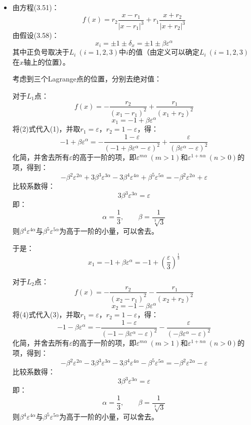 \documentclass[a4paper,fontset=windows]{ctexart}
\begin{document}
\begin{itemize}
        \item[3.]
        由方程(3.51)：
        \[
        f(x) = r_2\frac{x-r_1}{|x-r_1|^3} + r_1\frac{x+r_2}{|x+r_2|^3}
        \]
        由假设(3.58)：
        \[
        x_i = \pm 1 \pm \delta_x = \pm 1 \pm \beta\varepsilon^\alpha
        \]
        其中正负号取决于$L_i\ (i=1,2,3)$中$i$的值（由定义可以确定$L_i\ (i=1,2,3)$在$x$轴上的位置）。

        考虑到三个Lagrange点的位置，分别去绝对值：

        对于$L_1$点：
        \[
        f(x) = -\frac{r_2}{(x_1-r_1)^2} + \frac{r_1}{(x_1+r_2)^2} \tag{1}
        \]
        \[
        x_1 = -1 + \beta\varepsilon^\alpha \tag{2}
        \]
        将(2)式代入(1)，并取$r_1=\varepsilon$，$r_2=1-\varepsilon$，得：
        \[
        -1 + \beta\varepsilon^\alpha = -\frac{1-\varepsilon}{(-1+\beta\varepsilon^\alpha-\varepsilon)^2} + \frac{\varepsilon}{\left(\beta\varepsilon^\alpha-\varepsilon\right)^2}
        \]
        化简，并舍去所有$\varepsilon$的高于一阶的项，即$\varepsilon^{m\alpha}\ (m>1)$和$\varepsilon^{1+n\alpha}\ (n>0)$的项，得到：
        \[
        -\beta^2\varepsilon^{2\alpha} + 3\beta^3\varepsilon^{3\alpha} - 3\beta^4\varepsilon^{4\alpha} + \beta^5\varepsilon^{5\alpha} = -\beta^2\varepsilon^{2\alpha} + \varepsilon
        \]
        比较系数得：
        \[
        3\beta^3\varepsilon^{3\alpha} = \varepsilon
        \]
        即：
        \[
        \alpha = \frac{1}{3},\qquad \beta = \frac{1}{\sqrt[3]{3}}
        \]
        则$\beta^4\varepsilon^{4\alpha}$与$\beta^5\varepsilon^{5\alpha}$为高于一阶的小量，可以舍去。

        于是：
        \[
        x_1 = -1 + \beta\varepsilon^\alpha = -1 + \left(\frac{\varepsilon}{3}\right)^{\tfrac{1}{3}}
        \]
        \medskip

        对于$L_2$点：
        \[
        f(x) = -\frac{r_2}{(x_2-r_1)^2} - \frac{r_1}{(x_2+r_2)^2} \tag{3}
        \]
        \[
        x_2 = -1 - \beta\varepsilon^\alpha \tag{4}
        \]
        将(4)式代入(3)，并取$r_1=\varepsilon$，$r_2=1-\varepsilon$，得：
        \[
        -1 - \beta\varepsilon^\alpha = -\frac{1-\varepsilon}{(-1-\beta\varepsilon^\alpha-\varepsilon)^2} - \frac{\varepsilon}{\left(-\beta\varepsilon^\alpha-\varepsilon\right)^2}
        \]
        化简，并舍去所有$\varepsilon$的高于一阶的项，即$\varepsilon^{m\alpha}\ (m>1)$和$\varepsilon^{1+n\alpha}\ (n>0)$的项，得到：
        \[
        -\beta^2\varepsilon^{2\alpha} - 3\beta^3\varepsilon^{3\alpha} - 3\beta^4\varepsilon^{4\alpha} - \beta^5\varepsilon^{5\alpha} = -\beta^2\varepsilon^{2\alpha} - \varepsilon
        \]
        比较系数得：
        \[
        3\beta^3\varepsilon^{3\alpha} = \varepsilon
        \]
        即：
        \[
        \alpha = \frac{1}{3},\qquad \beta = \frac{1}{\sqrt[3]{3}}
        \]
        则$\beta^4\varepsilon^{4\alpha}$与$\beta^5\varepsilon^{5\alpha}$为高于一阶的小量，可以舍去。


\end{itemize}
\end{document}
